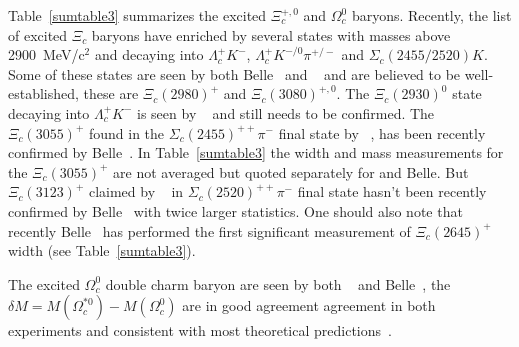 Table~\ref{sumtable3} summarizes the excited $\Xi_c^{+,0}$ and $\Omega_c^0$ 
baryons. Recently, the list of excited $\Xi_c$ baryons have enriched by 
several states with masses above 2900~MeV/c$^2$ and decaying into 
$\Lambda_c^+ K^-$, $\Lambda_c^+ K^{-/0}\pi^{+/-}$ and $\Sigma_c(2455/2520) K$. 
Some of these states are seen by both Belle~\cite{Chistov:2006zj,YKato:2014} 
and \babar~\cite{Aubert:2007dt} and are believed to be well-established, 
these are $\Xi_c(2980)^+$ and $\Xi_c(3080)^{+,0}$. 
The $\Xi_c(2930)^0$ state decaying into 
$\Lambda_c^+ K^-$ is seen by \babar~\cite{Aubert:2008cb} 
and still needs to be confirmed.  
The $\Xi_c(3055)^+$ found in the $\Sigma_c(2455)^{++}\pi^-$ final state by \babar~\cite{Aubert:2007dt}, 
has been recently confirmed by Belle~\cite{YKato:2014}. 
In Table~\ref{sumtable3} the width and mass measurements for the $\Xi_c(3055)^+$ 
are not averaged but quoted separately for \babar and Belle. 
But $\Xi_c(3123)^+$ claimed by \babar~\cite{Aubert:2007dt} in 
$\Sigma_c(2520)^{++}\pi^-$ final state hasn't been recently
confirmed by Belle~\cite{YKato:2014} with twice larger statistics.   
One should also note that recently Belle~\cite{YKato:2014} 
has performed the first significant measurement of $\Xi_c(2645)^+$ width (see Table~\ref{sumtable3}). 




The excited $\Omega_c^0$ double charm baryon are seen by both 
\babar~\cite{Aubert:2006je} and Belle~\cite{Solovieva:2008fw}, the 
$\delta M=M(\Omega_c^{*0})-M(\Omega_c^0)$ are in good agreement 
agreement in both experiments and consistent with most theoretical 
predictions~\cite{Rosner:1995yu,Glozman:1995xy,Jenkins:1996de,
Burakovsky:1997vm}. 
   

